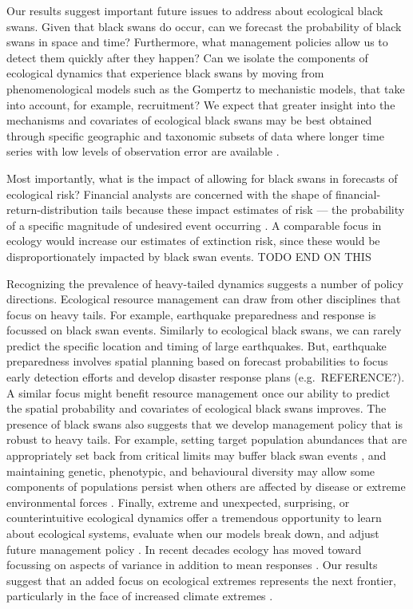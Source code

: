 Our results suggest important future issues to address about ecological black swans. Given that black swans do occur, can we forecast the probability of black swans in space and time? Furthermore, what management policies allow us to detect them quickly after they happen? Can we isolate the components of ecological dynamics that experience black swans by moving from phenomenological models such as the Gompertz to mechanistic models, that take into account, for example, recruitment? We expect that greater insight into the mechanisms and covariates of ecological black swans may be best obtained through specific geographic and taxonomic subsets of data where longer time series with low levels of observation error are available \citep[e.g.][]{segura2013}.

Most importantly, what is the impact of allowing for black swans in forecasts of ecological risk? Financial analysts are concerned with the shape of financial-return-distribution tails because these impact estimates of risk --- the probability of a specific magnitude of undesired event occurring \citep{rachev2008}. A comparable focus in ecology would increase our estimates of extinction risk, since these would be disproportionately impacted by black swan events.
TODO END ON THIS

Recognizing the prevalence of heavy-tailed dynamics suggests a number of policy directions. Ecological resource management can draw from other disciplines that focus on heavy tails. For example, earthquake preparedness and response is focussed on black swan events. Similarly to ecological black swans, we can rarely predict the specific location and timing of large earthquakes. But, earthquake preparedness involves spatial planning based on forecast probabilities to focus early detection efforts and develop disaster response plans (e.g.~REFERENCE?). A similar focus might benefit resource management once our ability to predict the spatial probability and covariates of ecological black swans improves. The presence of black swans also suggests that we develop management policy that is robust to heavy tails. For example, setting target population abundances that are appropriately set back from critical limits may buffer black swan events \citep[e.g.][]{caddy1996}, and maintaining genetic, phenotypic, and behavioural diversity may allow some components of populations persist when others are affected by disease or extreme environmental forces \citep[e.g.][]{hilborn2003, schindler2010, anderson2014}. Finally, extreme and unexpected, surprising, or counterintuitive ecological dynamics offer a tremendous opportunity to learn about ecological systems, evaluate when our models break down, and adjust future management policy \citep{doak2008, pine-iii2009, lindenmayer2010}. In recent decades ecology has moved toward focussing on aspects of variance in addition to mean responses \citep[e.g.][]{loreau2010a, thompson2013}. Our results suggest that an added focus on ecological extremes represents the next frontier, particularly in the face of increased climate extremes \citep{meehl2004,ipcc2012}.

